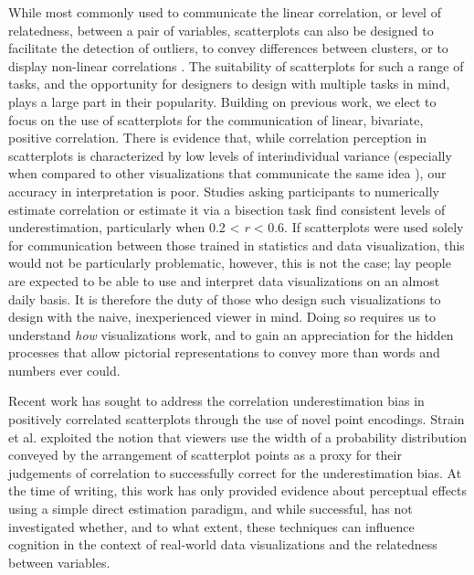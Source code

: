 \documentclass[manuscript,screen,review,anonymous]{acmart}
\begin{document}
While most commonly used to communicate the linear correlation, or level
of relatedness, between a pair of variables, scatterplots can also be
designed to facilitate the detection of outliers, to convey differences
between clusters, or to display non-linear correlations
\citep{sarikaya_2018}. The suitability of scatterplots for such a range
of tasks, and the opportunity for designers to design with multiple
tasks in mind, plays a large part in their popularity. Building on
previous work, we elect to focus on the use of scatterplots for the
communication of linear, bivariate, positive correlation. There is
evidence that, while correlation perception in scatterplots is
characterized by low levels of interindividual variance (especially when
compared to other visualizations that communicate the same idea
\citep{harrison_2014, kay_2015}), our accuracy in interpretation is
poor. Studies asking participants to numerically estimate correlation
\citep{strahan_1978, bobko_1979, cleveland_1982, lane_1985, lauer_1989, collyer_1990, meyer_1992}
or estimate it via a bisection task \citep{rensink_2017} find consistent
levels of underestimation, particularly when 0.2 \textless{} \emph{r}
\textless{} 0.6. If scatterplots were used solely for communication
between those trained in statistics and data visualization, this would
not be particularly problematic, however, this is not the case; lay
people are expected to be able to use and interpret data visualizations
on an almost daily basis. It is therefore the duty of those who design
such visualizations to design with the naive, inexperienced viewer in
mind. Doing so requires us to understand \emph{how} visualizations work,
and to gain an appreciation for the hidden processes that allow
pictorial representations to convey more than words and numbers ever
could.

Recent work has sought to address the correlation underestimation bias
in positively correlated scatterplots through the use of novel point
encodings. Strain et al. \citep{strain_2023, strain_2023b, strain_2024}
exploited the notion that viewers use the width of a probability
distribution conveyed by the arrangement of scatterplot points as a
proxy for their judgements of correlation to successfully correct for
the underestimation bias. At the time of writing, this work has only
provided evidence about perceptual effects using a simple direct
estimation paradigm, and while successful, has not investigated whether,
and to what extent, these techniques can influence cognition in the
context of real-world data visualizations and the relatedness between
variables.
\end{document}
